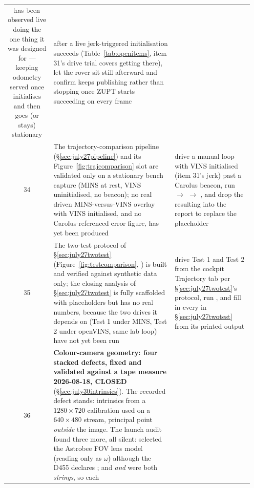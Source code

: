 \begin{longtable}{@{}cL{6.2cm}L{6.8cm}@{}}
    has been observed live doing the one thing it was designed for —
    keeping odometry served once  initialises and then
    goes (or stays) stationary &
    after a live jerk-triggered initialisation succeeds
    (Table~\ref{tab:openitems}, item 31's drive trial covers getting
    there), let the rover sit still afterward and confirm
     keeps publishing rather than stopping once
    ZUPT starts succeeding on every frame \\
34 & The trajectory-comparison pipeline (\S\ref{sec:july27pipeline}) and its
    Figure~\ref{fig:trajcomparison} slot are validated only on a stationary
    bench capture (MINS at rest, VINS uninitialised, no beacon); no real
    driven MINS-versus-VINS overlay with VINS initialised, and no
    Carolus-referenced error figure, has yet been produced &
    drive a manual loop with VINS initialised (item 31's jerk) past a
    Carolus beacon, run  $\rightarrow$
     $\rightarrow$ , and
    drop the resulting  into the report
    to replace the placeholder \\
35 & The two-test protocol of \S\ref{sec:july27twotest}
    (Figure~\ref{fig:testcomparison}, ) is built and
    verified against synthetic data only; the closing analysis of
    \S\ref{sec:july27twotest} is fully scaffolded with  placeholders but has no real numbers, because the two drives
    it depends on (Test 1 under MINS, Test 2 under openVINS, same lab loop)
    have not yet been run &
    drive Test 1 and Test 2 from the cockpit Trajectory tab per
    \S\ref{sec:july27twotest}'s protocol, run , and
    fill in every  in
    \S\ref{sec:july27twotest} from its printed output \\
36 & \textbf{Colour-camera geometry: four stacked defects, fixed and
    validated against a tape measure 2026-08-18, CLOSED}
    (\S\ref{sec:july30intrinsics}). The recorded defect stands: intrinsics
    from a $1280\times720$ calibration used on a $640\times480$ stream,
    principal point \emph{outside} the image. The launch audit found three
    more, all silent:  selected the Astrobee FOV lens model
    (reading only  as $\omega$) although the D455
    declares ; and  \emph{and}
     were both  \emph{strings}, so each

\end{longtable}
